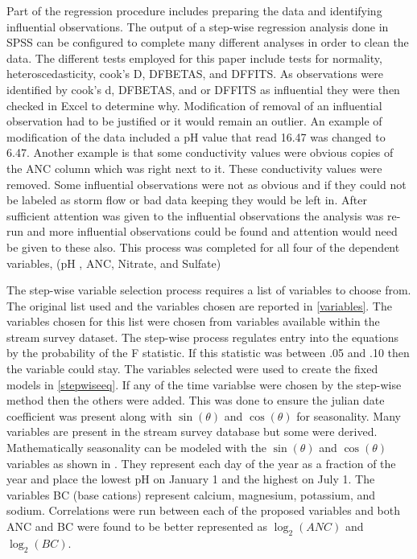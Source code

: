  Part of the regression procedure includes preparing the data and  identifying influential observations.  The output of a step-wise regression analysis done in SPSS can be configured to complete many different analyses in order to clean the data.  The different tests employed for this paper include tests for normality, heteroscedasticity, cook's D, DFBETAS, and DFFITS.  As observations were identified by cook's d, DFBETAS, and or DFFITS as influential they were then checked in Excel to determine why.  Modification of removal of an influential observation had to be justified or it would remain an outlier.  An example of modification of the data included a pH value that read 16.47 was changed to 6.47.  Another example is that some conductivity values were obvious copies of the ANC column which was right next to it.  These conductivity values were removed.   Some influential observations were not as obvious and if they could not be labeled as storm flow or bad data keeping they would be left in.  After sufficient attention was given to the influential observations the analysis was re-run and more influential observations could be found and attention would need be given to these also.  This process was completed for all four of the dependent variables, (pH , ANC, Nitrate, and Sulfate)
 
 The step-wise variable selection process requires a list of variables to choose from.  The original list used and the variables chosen are reported in \autoref{variables}.  The variables chosen for this list were chosen from variables available within the stream survey dataset.  The step-wise process regulates entry into the equations by the probability of the F statistic.  If this statistic was between .05 and .10 then the variable could stay.   The variables selected were used to create the fixed models in \autoref{stepwiseeq}.  If any of the time variablse were chosen by the step-wise method then the others were added.  This was done to ensure the julian date coefficient was present along with $\sin(\theta)$ and $\cos(\theta)$ for seasonality.  Many variables are present in the stream survey database but some were derived.  Mathematically seasonality can be modeled with the $\sin(\theta)$ and $\cos(\theta)$ variables as shown in \citet{helsel1992statistical}.  They represent each day of the year as a fraction of the year and place the lowest pH on January 1 and the highest on July 1.  The variables BC (base cations) represent calcium, magnesium, potassium, and sodium.  Correlations were run between each of the proposed variables  and both ANC and BC were found to be better represented as $\log_2(ANC)$ and $\log_2(BC)$.
 
